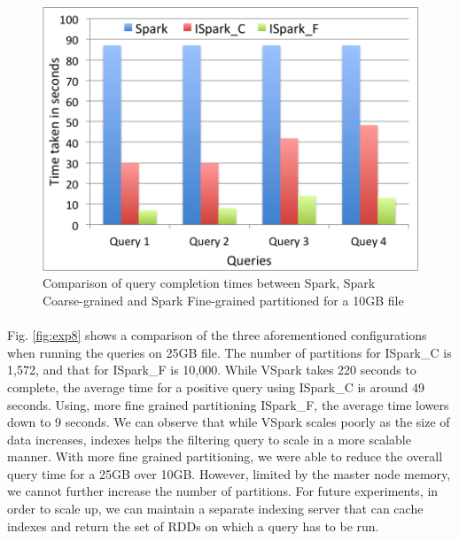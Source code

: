 \begin{figure}[!ht]
\caption{Comparison of query completion times between Spark, Spark Coarse-grained and Spark Fine-grained partitioned for a 10GB file}
\label{fig:exp7}
\includegraphics[scale=0.50]{./images/exp7.png}
\end{figure}

\paragraph{}
Fig. \ref{fig:exp8} shows a comparison of the three aforementioned
configurations when running the queries on 25GB file. The number of
partitions for ISpark\_C is 1,572, and that for ISpark\_F is 10,000.
While VSpark takes 220 seconds to complete, the average time for a
positive query using ISpark\_C is around 49 seconds. Using, more fine
grained partitioning ISpark\_F, the average time lowers down to 9
seconds. We can observe that while VSpark scales poorly as the size of %
data increases, indexes helps the filtering query to scale in a more
scalable manner. With more fine grained partitioning, we were able to
reduce the overall query time for a 25GB over 10GB. However, limited by
the master node memory, we cannot further increase the number of
partitions. For future experiments, in order to scale up, we can
maintain a separate indexing server that can cache indexes and return
the set of RDDs on which a query has to be run. 

